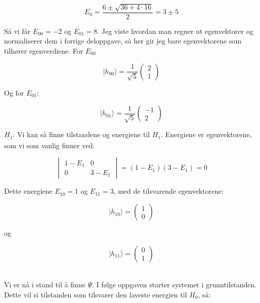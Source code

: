 \documentclass[a4paper,norsk, 10pt]{article}
\numberwithin{equation}{section}
\begin{document}
$$
E_0 = \frac{6 \pm \sqrt{36 + 4\cdot 16}}{2} = 3\pm 5
$$

Så vi får $E_{00} = -2$ og $E_{01} = 8$. Jeg viste hvordan man regner ut egenvektorer og normaliserer dem i forrige deloppgave, så her gir jeg bare egenvektorene som tilhører egenverdiene. For $E_{00}$

\begin{equation}
|h_{00}\rangle = \frac{1}{\sqrt{5}}
\begin{pmatrix}
2\\ 1
\end{pmatrix}
\label{eq:h00}
\end{equation}

Og for $E_{01}$:

\begin{equation}
|h_{01}\rangle = \frac{1}{\sqrt{5}}
\begin{pmatrix}
-1\\ 2
\end{pmatrix}
\label{eq:h01}
\end{equation}

\textbf{$\underline{H_1}$}: Vi kan så finne tilstandene og energiene til $H_1$. Energiene er egenvektorene, som vi som vanlig finner ved:

$$
\begin{vmatrix}
1-E_1 & 0\\
0 & 3-E_1
\end{vmatrix}
= (1-E_1)(3-E_1) = 0
$$

Dette energiene $E_{10} = 1$ og $E_{11} = 3$, med de tilsvarende egenvektorene:

\begin{equation}
|h_{10}\rangle = 
\begin{pmatrix}
1\\0
\end{pmatrix}
\label{eq:h10}
\end{equation}

og 

\begin{equation}
|h_{11}\rangle = 
\begin{pmatrix}
0\\1
\end{pmatrix}
\label{eq:h11}
\end{equation}\\

\newpage

Vi er nå i stand til å finne $\Psi$. I følge oppgaven starter systemet i grunntilstanden. Dette vil si tilstanden som tilsvarer den laveste energien til $H_0$, så:
\end{document}
